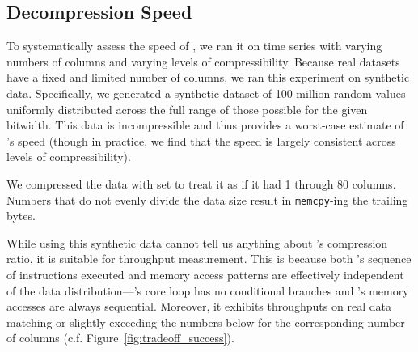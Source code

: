 \subsection{Decompression Speed} \label{sec:decomp_speed}

To systematically assess the speed of \minesp, we ran it on time series with varying numbers of columns and varying levels of compressibility. Because real datasets have a fixed and limited number of columns, we ran this experiment on synthetic data. Specifically, we generated a synthetic dataset of 100 million random values uniformly distributed across the full range of those possible for the given bitwidth. This data is incompressible and thus provides a worst-case estimate of \mine's speed (though in practice, we find that the speed is largely consistent across levels of compressibility). %

We compressed the data with \minesp set to treat it as if it had 1 through 80 columns. Numbers that do not evenly divide the data size result in \minesp \texttt{memcpy}-ing the trailing bytes.

While using this synthetic data cannot tell us anything about \mine's compression ratio, it is suitable for throughput measurement. This is because both \mine's sequence of instructions executed and memory access patterns are effectively independent of the data distribution---\mine's core loop has no conditional branches and \minesp's memory accesses are always sequential. Moreover, it exhibits throughputs on real data matching or slightly exceeding the numbers below for the corresponding number of columns (c.f. Figure~\ref{fig:tradeoff_success}). %

